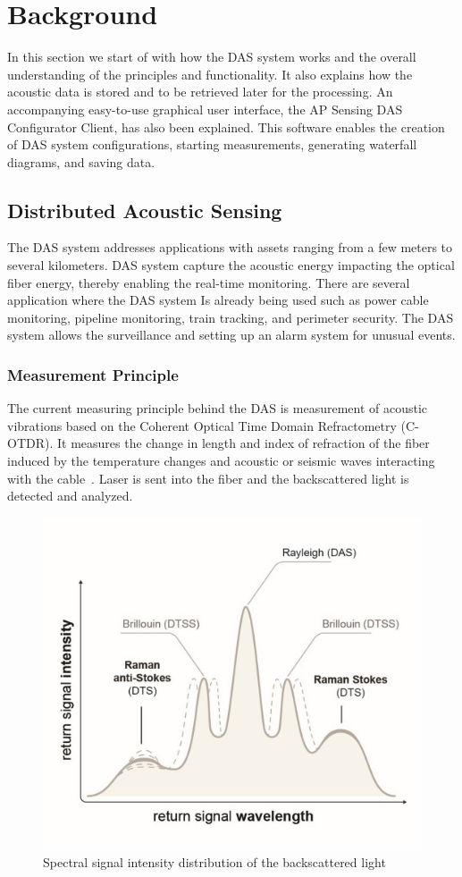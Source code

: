 %
%
%
\chapter{Background}
In this section we start of with how the DAS system works and the overall understanding of the principles and functionality. It also explains how the acoustic data is stored and to be retrieved later for the processing. An accompanying easy-to-use graphical user interface, the AP Sensing DAS Configurator Client, has also been explained. This software enables the creation of DAS system configurations, starting measurements, generating waterfall diagrams, and saving data.  

\section{Distributed Acoustic Sensing}
The DAS system addresses applications with assets ranging from a few meters to several kilometers. DAS system capture the acoustic energy impacting the optical fiber energy, thereby enabling the real-time monitoring. There are several application where the DAS system Is already being used such as power cable monitoring, pipeline monitoring, train tracking, and perimeter security. The DAS system allows the surveillance and setting up an alarm system for unusual events. 

\subsection{Measurement Principle}

The current measuring principle behind the DAS is measurement of acoustic vibrations based on the Coherent Optical Time Domain Refractometry (C-OTDR). It measures the change in length and index of refraction of the fiber induced by the temperature changes and acoustic or seismic waves interacting with the cable~\cite{duckworth}. Laser is sent into the fiber and the backscattered light is detected and analyzed. 

\begin{figure}[h]
    \centering
    \includegraphics[width=0.7\linewidth]{Bilder/jpg/COTDR.jpg}
    \caption{Spectral signal intensity distribution of the backscattered light~\cite{DAS_Manual}}
    \label{COTDR}
\end{figure}
 

